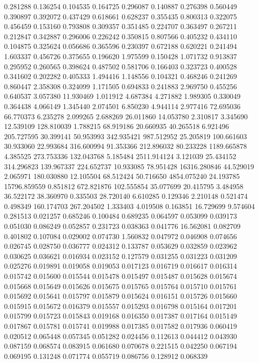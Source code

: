 0.281288
0.136254
0.104535
0.164725
0.296087
0.140887
0.276398
0.560449
0.390897
0.392072
0.437429
0.618661
0.628237
0.355435
0.800313
0.322075
0.456459
0.153160
0.793808
0.309357
0.351485
0.224707
0.363497
0.267211
0.212847
0.342887
0.296006
0.226242
0.350815
0.807566
0.405232
0.434110
0.104875
0.325624
0.056686
0.365596
0.230397
0.672188
0.620221
0.241494
1.603337
0.456726
0.375655
0.196620
1.975599
0.150428
1.071732
0.913837
0.295952
0.260565
0.398624
0.487502
0.581706
0.166403
0.323723
0.400528
0.341602
0.202282
0.405333
1.494416
1.148556
0.104321
0.468246
0.241269
0.860447
2.358308
0.324099
1.171505
0.694833
0.241883
2.969750
0.455256
0.640537
3.057380
11.930469
1.011912
4.687384
4.271882
1.989305
0.330049
0.364438
4.066149
1.345440
2.074501
6.850230
4.944114
2.977416
72.695036
66.770373
6.235278
2.099265
2.688269
26.011860
14.053780
2.310817
3.345690
12.539109
128.810039
1.788215
68.919186
20.660935
40.265518
6.921496
205.727595
30.399141
50.953993
342.935421
987.512952
25.205819
100.661603
30.933060
22.993684
316.600994
91.353366
212.896032
80.233228
1189.665878
4.385525
273.753336
132.043768
5.185484
2511.914124
3.121039
25.434152
314.296823
139.967337
224.652737
10.933085
78.951428
16316.280846
44.529019
2.065971
180.030880
12.105504
68.512424
50.716650
4854.075240
24.193785
15796.859559
0.851812
672.821876
102.555854
35.077699
20.415795
3.484958
36.522172
38.360970
0.335503
28.720140
6.610285
0.129346
2.210148
0.521474
0.498349
160.174703
267.204502
1.333403
4.019508
0.163851
16.729699
9.574604
0.281513
0.021257
0.685246
0.100484
0.689235
0.064597
0.053099
0.039173
0.051030
0.086249
0.052857
0.231723
0.038363
0.041776
16.562081
0.082709
0.401802
0.107084
0.029002
0.074730
1.560832
0.047972
0.046908
0.074656
0.026745
0.028750
0.036777
0.024312
0.133787
0.053629
0.032859
0.023962
0.030625
0.036621
0.016934
0.023152
0.127579
0.031255
0.031223
0.031209
0.025276
0.019891
0.019058
0.019053
0.017123
0.016719
0.016617
0.016314
0.015742
0.015600
0.015544
0.015478
0.015497
0.015487
0.015628
0.015674
0.015668
0.015649
0.015626
0.015675
0.015765
0.015764
0.015710
0.015761
0.015692
0.015641
0.015797
0.015879
0.015624
0.016151
0.015726
0.015660
0.015915
0.015672
0.016379
0.015557
0.015293
0.016798
0.015164
0.017201
0.015799
0.015723
0.015843
0.019168
0.016350
0.017387
0.017164
0.015149
0.017867
0.015781
0.015741
0.019988
0.017385
0.017582
0.017936
0.060419
0.020512
0.065448
0.057345
0.051282
0.024456
0.112613
0.044412
0.043930
0.087159
0.068574
0.083915
0.061680
0.070678
0.221515
0.042250
0.067194
0.069195
0.131248
0.071774
0.055719
0.086756
0.128912
0.068339
